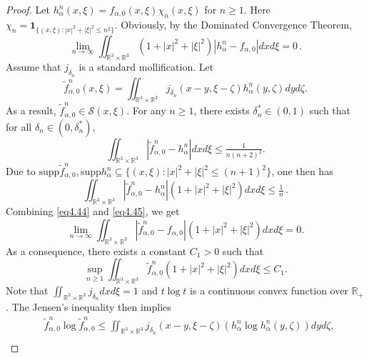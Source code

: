 \documentclass[reqno,11pt]{amsart}
\numberwithin{equation}{section}
\def\R{\mathbb{R}}
\begin{document}
\begin{proof}
 Let $h^n_\alpha (x,\xi ) = f_{\alpha,0 } (x,\xi )  \chi_n (x,\xi )$ for $ n \geq 1$. Here $\chi_n = \mathbf{1}_{ \{ (x,\xi) : |x|^2+ |\xi|^2 \leq n^2 \} }$. Obviously, by the Dominated Convergence Theorem,
	\begin{equation}\label{eq4.44}
		\lim \limits_{n\rightarrow \infty}  \iint_{\R^3 \times \R^3 } (1+|x|^2 +|\xi|^2) |h^n_\alpha - f_{\alpha,0 }| d x d \xi = 0 \,.
	\end{equation}
	Assume that $j_{\delta_n} $ is a standard mollification. Let 
	\begin{equation*}
		\tilde{f}^n_{\alpha,0 } (x,\xi ) = \iint_{\R^3 \times \R^3 } j_{\delta_n } (x-y, \xi - \zeta ) h^n_\alpha (y,\zeta)dyd\zeta .
	\end{equation*}
	As a result, $\tilde{f}^n_{\alpha,0 } \in \mathscr{S} (x,\xi )$.
	For any $ n \geq 1$, there exists $\delta_n^* \in (0,1)$ such that for all $\delta_n \in (0, \delta_n^*)$,
	\begin{equation*}
		\iint_{\R^3 \times \R^3 } |\tilde{f}^n_{\alpha,0 } -h^n_\alpha | dxd\xi \leq \tfrac{1}{n(n+2)^2 }.
	\end{equation*}
Due to $\mathrm{supp} \tilde{f}^n_{\alpha ,0} , \mathrm{supp} h^n_\alpha \subseteq
 \{ (x,\xi ) : |x|^2 + |\xi|^2 \leq (n+1)^2 \}$, one then has
	\begin{equation}\label{eq4.45}
		\iint_{\R^3 \times \R^3 } |\tilde{f}^n_{\alpha,0 } -h^n_\alpha |(1+|x|^2 + |\xi|^2  ) dxd\xi \leq \tfrac{1}{n} \,.
	\end{equation}
Combining \eqref{eq4.44} and \eqref{eq4.45}, we get
	\begin{equation} \label{eq4.46}
		\lim \limits_{n\rightarrow \infty } \iint_{\R^3 \times \R^3 } |\tilde{f}^n_{\alpha,0 } -f_{\alpha,0 } | (1+|x|^2 + |\xi|^2  ) dxd\xi =0.
	\end{equation}
As a consequence, there exists a constant $C_1 > 0$ such that  
	\begin{equation} \label{eq4.47}
		\sup \limits_{n\geq 1 } \iint_{\R^3 \times \R^3 } \tilde{f}^n_{\alpha,0 } (1+|x|^2 + |\xi|^2) dxd\xi \leq C_1 .
	\end{equation}
Note that $\iint_{\R^3 \times \R^3 } j_{\delta_n} dxd\xi =1$ and $ t\log t $ is a continuous convex function over $\R_+$. The Jensen's inequality then implies
	\begin{equation*}
		\begin{aligned}
			&\tilde{f}^n_{\alpha,0 } \log \tilde{f}^n_{\alpha,0 } \leq \iint_{\R^3 \times \R^3 } j_{\delta_n } (x-y, \xi - \zeta ) ( h^n_\alpha \log h^n_\alpha (y,\zeta ))dyd\zeta, \\

\end{aligned}
\end{equation*}
\end{proof}
\end{document}
